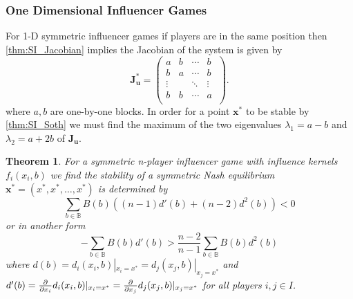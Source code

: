 \documentclass{article}
\newtheorem{theorem}{Theorem}[section]
\newcommand {\B}{\mathbb{B}}
\begin{document}
            \subsubsection{One Dimensional Influencer Games}
                
                 For 1-D  symmetric influencer games if players are in the same position then \cref{thm:SI_Jacobian} implies the Jacobian of the system is given by 
                \begin{equation}
                    \mathbf{J}_{\mathbf{u}}^*=\begin{pmatrix}
                    a & b& \cdots & b\ \\ %
                    b & a & \cdots & b\ \\ %
                    \vdots &  & \ddots &\vdots \\ %
                    b & b & \cdots & a\ \\ %
                    \end{pmatrix}.
                \end{equation}
                where $a,b$ are one-by-one blocks. In order for a point $\mathbf{x}^*$ to be stable by \cref{thm:SI_Soth} we must find the maximum of the two eigenvalues $\lambda_1=a-b$ and $\lambda_2=a+2b$ of $\mathbf{J}_{\mathbf{u}}$. 
                \begin{theorem}\label{thm:SI_one-dimensional-stability}
                    For a symmetric n-player influencer game with influence kernels $f_i(x_i,b)$ we find the stability of a symmetric Nash equilibrium $\mathbf{x}^{*}=(x^*,x^*,\dots,x^*)$ is determined by 
                    \begin{equation}\label{eq:SS_threshold_1d_general}
                        \sum_{b\in\B}B(b)((n-1)d'(b)+(n-2)d^2(b)) <0
                    \end{equation}
                    or in another form 
                    \begin{equation}
                         -\sum_{b\in \B} B(b)d'(b)>\frac{n-2}{n-1}\sum_{b\in \B} B(b)d^2(b)
                    \end{equation}
                    where $d(b)=d_i(x_i,b)|_{x_i=x^*}=d_j(x_j,b)|_{x_j=x^*}$ and $d'(b)=\pdv{}{x_i}d_i(x_i,b)|_{x_i=x^*}=\pdv{}{x_j}d_j(x_j,b)|_{x_j=x^*}$ for all players $i,j\in I$.   
                \end{theorem}
\end{document}
